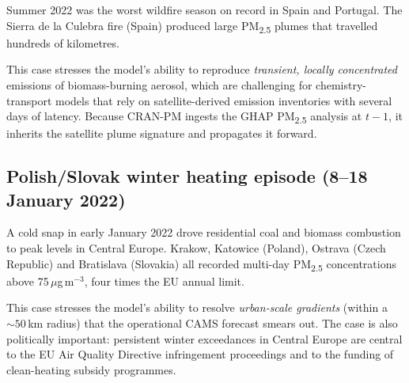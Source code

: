 Summer 2022 was the worst wildfire season on record in Spain and
Portugal. The Sierra de la Culebra fire (Spain) produced large
PM\textsubscript{2.5} plumes that travelled hundreds of kilometres.

This case stresses the model's ability to reproduce
\emph{transient, locally concentrated} emissions of biomass-burning
aerosol, which are challenging for chemistry-transport models that
rely on satellite-derived emission inventories with several days of
latency. Because CRAN-PM ingests the GHAP PM\textsubscript{2.5}
analysis at $t-1$, it inherits the satellite plume signature and
propagates it forward.


\subsection{Polish/Slovak winter heating episode (8--18 January 2022)}
\label{sec:case:polish}

A cold snap in early January 2022 drove residential coal and biomass
combustion to peak levels in Central Europe. Krakow, Katowice
(Poland), Ostrava (Czech Republic) and Bratislava (Slovakia) all
recorded multi-day PM\textsubscript{2.5} concentrations above
75\,$\mu$g\,m$^{-3}$, four times the EU annual limit.

This case stresses the model's ability to resolve
\emph{urban-scale gradients} (within a $\sim 50$\,km radius) that
the operational CAMS forecast smears out. The case is also
politically important: persistent winter exceedances in Central
Europe are central to the EU Air Quality Directive infringement
proceedings and to the funding of clean-heating subsidy programmes.

